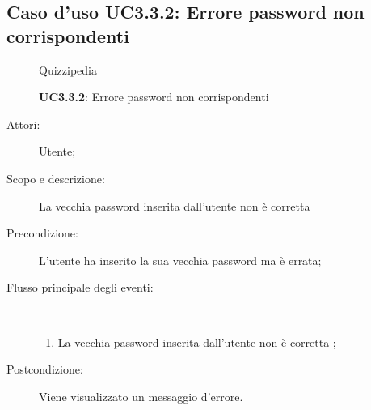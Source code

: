 \subsection{Caso d'uso UC3.3.2: Errore password non corrispondenti}
	\begin{figure}[H]
		\centering
		\begin{resizedtikzpicture}{\textwidth}
		\begin{umlsystem}[x=0, fill=lightgray!20]{Quizzipedia}
		\end{umlsystem}
		\end{resizedtikzpicture}
		\caption{\textbf{UC3.3.2}: Errore password non corrispondenti}
		\label{UC3.3.2}
	\end{figure}
\begin{description}
\item[Attori:] Utente;
\item[Scopo e descrizione:] La vecchia password inserita dall'utente non è corretta
      \item[Precondizione:] L'utente ha inserito la sua vecchia password ma è errata;

        \item[Flusso principale degli eventi:] \ 
 \begin{enumerate}
          \item La vecchia password inserita dall'utente non è corretta
;

      \end{enumerate}
    \item[Postcondizione:] Viene visualizzato un messaggio d'errore.
  \end{description}
\hypertarget{UC3.4}{}
